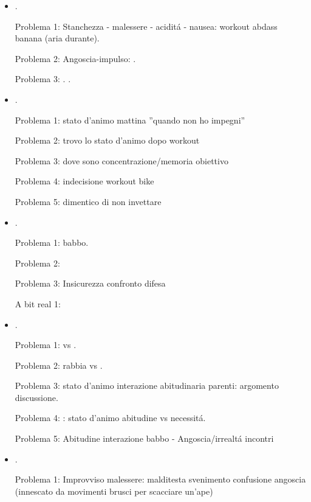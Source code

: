 \begin{itemize}
\item {}.

Problema 1: Stanchezza - malessere - acidit\'a - nausea: workout abdass banana (aria durante).

Problema 2: Angoscia-impulso: .

Problema 3: .  .

\item {}.

Problema 1: stato d'animo mattina ''quando non ho impegni''

Problema 2: trovo lo stato d'animo dopo workout

Problema 3: dove sono concentrazione/memoria obiettivo

Problema 4: indecisione workout bike

Problema 5: dimentico di non invettare 

\item {}.

Problema 1:  babbo.

Problema 2: 

Problema 3: Insicurezza confronto difesa

A bit real 1:  

\item {}.

Problema 1:  vs .

Problema 2: rabbia vs .

Problema 3: stato d'animo interazione abitudinaria parenti: argomento discussione.

Problema 4: : stato d'animo abitudine vs necessit\'a.

Problema 5: Abitudine interazione babbo - Angoscia/irrealt\'a incontri

\item {}.

Problema 1: Improvviso malessere: malditesta svenimento confusione angoscia (innescato da movimenti brusci per scacciare un'ape)


\end{itemize}
